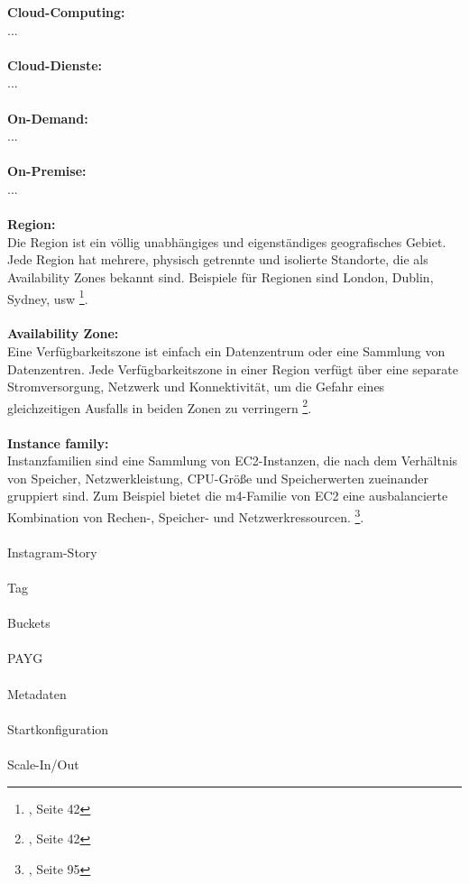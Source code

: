 

\textbf{Cloud-Computing:}\\
...
\\\\
\textbf{Cloud-Dienste:}\\
...
\\\\
\textbf{On-Demand:}\\
...
\\\\
\textbf{On-Premise:}\\
...
\\\\
\textbf{Region:}\\
Die Region ist ein völlig unabhängiges und eigenständiges geografisches Gebiet. Jede Region hat mehrere, physisch getrennte und isolierte Standorte, die als Availability Zones bekannt sind. Beispiele für Regionen sind London, Dublin, Sydney, usw \footnote{\cite{AWS1}, Seite 42}.
\\\\
\textbf{Availability Zone:}\\
Eine Verfügbarkeitszone ist einfach ein Datenzentrum oder eine Sammlung von Datenzentren. Jede Verfügbarkeitszone in einer Region verfügt über eine separate Stromversorgung, Netzwerk und Konnektivität, um die Gefahr eines gleichzeitigen Ausfalls in beiden Zonen zu verringern \footnote{\cite{AWS1}, Seite 42}.
\\\\

\textbf{Instance family:}\\
Instanzfamilien sind eine Sammlung von EC2-Instanzen, die nach dem Verhältnis von Speicher, Netzwerkleistung, CPU-Größe und Speicherwerten zueinander gruppiert sind. Zum Beispiel bietet die m4-Familie von EC2 eine ausbalancierte Kombination von Rechen-, Speicher- und Netzwerkressourcen. \footnote{\cite{AWS1}, Seite 95}.
\\\\
Instagram-Story
\\\\
Tag
\\\\
Buckets
\\\\
PAYG %
\\\\
Metadaten
\\\\
Startkonfiguration %
\\\\
Scale-In/Out

